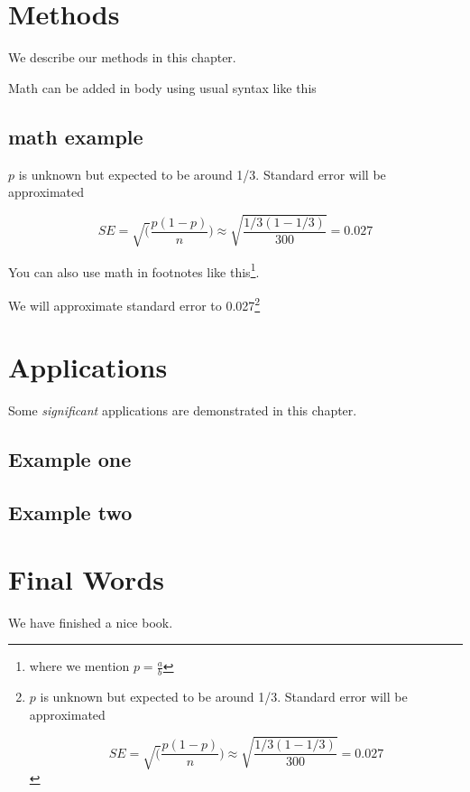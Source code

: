 \documentclass[
]{book}
\theoremstyle{definition}
\theoremstyle{definition}
\theoremstyle{definition}
\theoremstyle{definition}
\theoremstyle{remark}
\begin{document}
\hypertarget{methods}{%
\chapter{Methods}\label{methods}}

We describe our methods in this chapter.

Math can be added in body using usual syntax like this

\hypertarget{math-example}{%
\section{math example}\label{math-example}}

\(p\) is unknown but expected to be around 1/3. Standard error will be approximated

\[
SE = \sqrt(\frac{p(1-p)}{n}) \approx \sqrt{\frac{1/3 (1 - 1/3)} {300}} = 0.027
\]

You can also use math in footnotes like this\footnote{where we mention \(p = \frac{a}{b}\)}.

We will approximate standard error to 0.027\footnote{\(p\) is unknown but expected to be around 1/3. Standard error will be approximated

  \[
  SE = \sqrt(\frac{p(1-p)}{n}) \approx \sqrt{\frac{1/3 (1 - 1/3)} {300}} = 0.027
  \]}

\hypertarget{applications}{%
\chapter{Applications}\label{applications}}

Some \emph{significant} applications are demonstrated in this chapter.

\hypertarget{example-one}{%
\section{Example one}\label{example-one}}

\hypertarget{example-two}{%
\section{Example two}\label{example-two}}

\hypertarget{final-words}{%
\chapter{Final Words}\label{final-words}}

We have finished a nice book.

  
\end{document}
